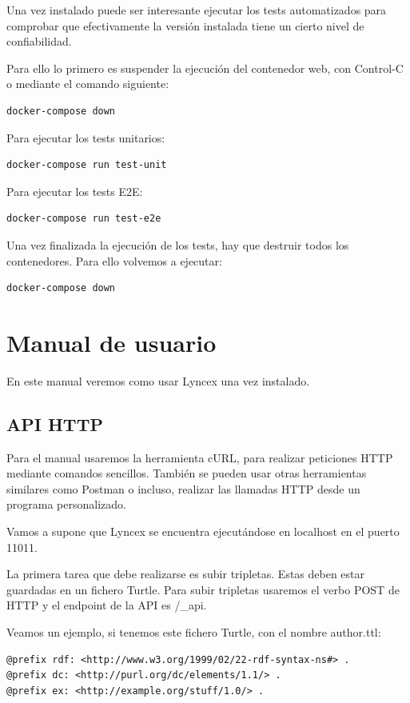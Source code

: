 \documentclass[12pt]{report} %
\begin{document}
\begin{itemize}
Una vez instalado puede ser interesante ejecutar los tests automatizados para comprobar que efectivamente la versión instalada tiene un cierto nivel de confiabilidad.

Para ello lo primero es suspender la ejecución del contenedor web, con Control-C o mediante el comando siguiente:
\begin{verbatim}
docker-compose down
\end{verbatim}

Para ejecutar los tests unitarios:
\begin{verbatim}
docker-compose run test-unit
\end{verbatim}

Para ejecutar los tests E2E:
\begin{verbatim}
docker-compose run test-e2e
\end{verbatim}

Una vez finalizada la ejecución de los tests, hay que destruir todos los contenedores. Para ello volvemos a ejecutar:
\begin{verbatim}
docker-compose down
\end{verbatim}

\section{Manual de usuario}

En este manual veremos como usar Lyncex una vez instalado. 

\subsection{API HTTP}
Para el manual usaremos la herramienta cURL, para realizar peticiones HTTP mediante comandos sencillos. También se pueden usar otras herramientas similares como Postman o incluso, realizar las llamadas HTTP desde un programa personalizado.

Vamos a supone que Lyncex se encuentra ejecutándose en localhost en el puerto 11011.

La primera tarea que debe realizarse es subir tripletas. Estas deben estar guardadas en un fichero Turtle. Para subir tripletas usaremos el verbo POST de HTTP y el endpoint de la API es /\_api.

Veamos un ejemplo, si tenemos este fichero Turtle, con el nombre author.ttl:

\begin{lstlisting}
@prefix rdf: <http://www.w3.org/1999/02/22-rdf-syntax-ns#> .
@prefix dc: <http://purl.org/dc/elements/1.1/> .
@prefix ex: <http://example.org/stuff/1.0/> .


\end{lstlisting}
\end{itemize}
\end{document}
